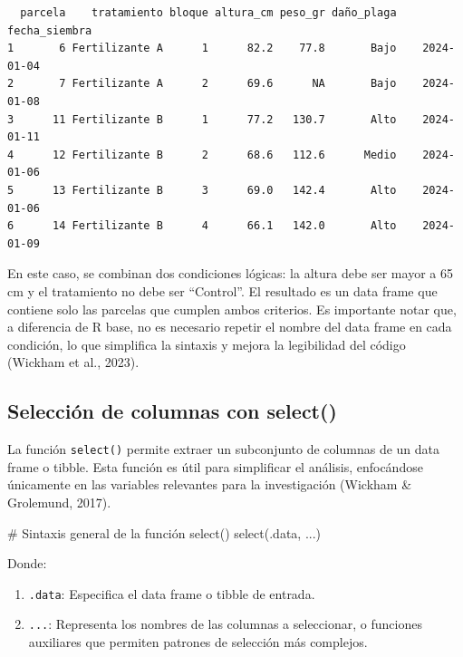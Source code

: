 \documentclass[
  spanish,
  a4paper,
  DIV=11,
  numbers=noendperiod,
  onepage,
  openany]{scrreprt}
\newenvironment{Shaded}{\begin{snugshade}}{\end{snugshade}}
\newcommand{\CommentTok}[1]{\textcolor[rgb]{0.37,0.37,0.37}{#1}}
\newcommand{\FunctionTok}[1]{\textcolor[rgb]{0.28,0.35,0.67}{#1}}
\newcommand{\NormalTok}[1]{\textcolor[rgb]{0.00,0.23,0.31}{#1}}
\begin{document}
\begin{verbatim}
  parcela    tratamiento bloque altura_cm peso_gr daño_plaga fecha_siembra
1       6 Fertilizante A      1      82.2    77.8       Bajo    2024-01-04
2       7 Fertilizante A      2      69.6      NA       Bajo    2024-01-08
3      11 Fertilizante B      1      77.2   130.7       Alto    2024-01-11
4      12 Fertilizante B      2      68.6   112.6      Medio    2024-01-06
5      13 Fertilizante B      3      69.0   142.4       Alto    2024-01-06
6      14 Fertilizante B      4      66.1   142.0       Alto    2024-01-09
\end{verbatim}

En este caso, se combinan dos condiciones lógicas: la altura debe ser
mayor a 65 cm y el tratamiento no debe ser ``Control''. El resultado es
un data frame que contiene solo las parcelas que cumplen ambos
criterios. Es importante notar que, a diferencia de R base, no es
necesario repetir el nombre del data frame en cada condición, lo que
simplifica la sintaxis y mejora la legibilidad del código (Wickham et
al., 2023).

\subsection{Selección de columnas con
select()}\label{selecciuxf3n-de-columnas-con-select}

La función \texttt{select()} permite extraer un subconjunto de columnas
de un data frame o tibble. Esta función es útil para simplificar el
análisis, enfocándose únicamente en las variables relevantes para la
investigación (Wickham \& Grolemund, 2017).

\begin{Shaded}
\begin{Highlighting}[]
\CommentTok{\# Sintaxis general de la función select()}
\FunctionTok{select}\NormalTok{(.data, ...)}
\end{Highlighting}
\end{Shaded}

Donde:

\begin{enumerate}
\def\labelenumi{\arabic{enumi}.}
\item
  \texttt{.data}: Especifica el data frame o tibble de entrada.
\item
  \texttt{...}: Representa los nombres de las columnas a seleccionar, o
  funciones auxiliares que permiten patrones de selección más complejos.
\end{enumerate}
\end{document}
